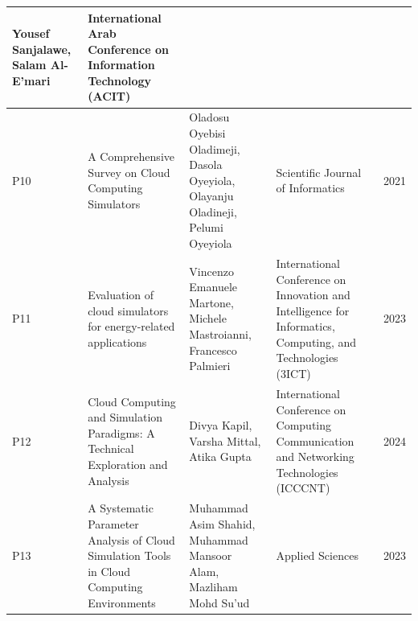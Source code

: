\begin{table}[ht]
\begin{tabularx}{\textwidth}{l>{\raggedright\arraybackslash}X>{\raggedright\arraybackslash}X>{\raggedright\arraybackslash}Xr}
  Yousef Sanjalawe, Salam Al-E’mari &
  International Arab Conference on Information Technology (ACIT) &
  2023 \\ \hline
P10 &
  A Comprehensive Survey on Cloud Computing Simulators &
  Oladosu Oyebisi Oladimeji, Dasola Oyeyiola, Olayanju Oladineji, Pelumi Oyeyiola &
  Scientific Journal of Informatics &
  2021 \\ \hline
P11 &
  Evaluation of cloud simulators for energy-related applications &
  Vincenzo Emanuele Martone, Michele Mastroianni, Francesco Palmieri &
  International Conference on Innovation and Intelligence for Informatics, Computing, and Technologies (3ICT) &
  2023 \\ \hline
P12 &
  Cloud Computing and Simulation Paradigms: A Technical Exploration and Analysis &
  Divya Kapil, Varsha Mittal, Atika Gupta &
  International Conference on Computing Communication and Networking Technologies (ICCCNT) &
  2024 \\ \hline
P13 &
  A Systematic Parameter Analysis of Cloud Simulation Tools in Cloud Computing Environments &
  Muhammad Asim Shahid, Muhammad Mansoor Alam, Mazliham Mohd Su’ud &
  Applied Sciences &
  2023 \\
\end{tabularx}
\end{table}

\newpage

